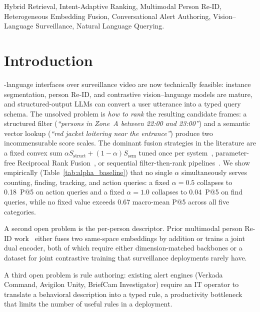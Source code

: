﻿\documentclass[conference]{IEEEtran}
\theoremstyle{definition}
\begin{document}
\begin{IEEEkeywords}
Hybrid Retrieval, Intent-Adaptive Ranking, Multimodal Person Re-ID, Heterogeneous Embedding Fusion, Conversational Alert Authoring, Vision--Language Surveillance, Natural Language Querying.
\end{IEEEkeywords}

\section{Introduction}

-language interfaces over surveillance video are now technically feasible: instance segmentation, person Re-ID, and contrastive vision--language models are mature, and structured-output LLMs can convert a user utterance into a typed query schema. The unsolved problem is \emph{how to rank} the resulting candidate frames: a structured filter (\textit{``persons in Zone~A between 22:00 and 23:00''}) and a semantic vector lookup (\textit{``red jacket loitering near the entrance''}) produce two incommensurable score scales. The dominant fusion strategies in the literature are a fixed convex sum $\alpha S_{\text{struct}} + (1-\alpha) S_{\text{sem}}$ tuned once per system~\cite{b7,b11,b12,b29}, parameter-free Reciprocal Rank Fusion~\cite{b27}, or sequential filter-then-rank pipelines~\cite{b30}. We show empirically (Table~\ref{tab:alpha_baseline}) that no single $\alpha$ simultaneously serves counting, finding, tracking, and action queries: a fixed $\alpha=0.5$ collapses to 0.18~P@5 on action queries and a fixed $\alpha=1.0$ collapses to 0.04~P@5 on find queries, while no fixed value exceeds 0.67 macro-mean P@5 across all five categories.

A second open problem is the per-person descriptor. Prior multimodal person Re-ID work~\cite{b22b,b32,b33,b34,b35} either fuses two same-space embeddings by addition or trains a joint dual encoder, both of which require either dimension-matched backbones or a dataset for joint contrastive training that surveillance deployments rarely have.

A third open problem is rule authoring: existing alert engines (Verkada Command, Avigilon Unity, BriefCam Investigator) require an IT operator to translate a behavioral description into a typed rule, a productivity bottleneck that limits the number of useful rules in a deployment.
\end{document}
